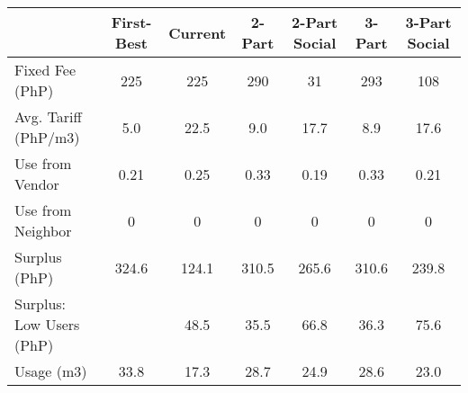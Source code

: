 \begin{tabular}{lcccccc}
  & First-Best & Current & 2-Part  & 2-Part Social  & 3-Part & 3-Part Social \\
\hline
Fixed Fee (PhP) &225&225&290&31&293&108\\
Avg. Tariff (PhP/m3) &5.0&22.5&9.0&17.7&8.9&17.6\\
Use from Vendor &0.21 &0.25 &0.33 &0.19 &0.33 &0.21\\
Use from Neighbor &0 &0 &0 &0 &0 &0 \\
Surplus (PhP) &324.6&124.1&310.5&265.6&310.6&239.8\\
Surplus: Low Users (PhP) &&48.5&35.5&66.8&36.3&75.6\\
Usage (m3) &33.8&17.3&28.7&24.9&28.6&23.0\\
\hline
\end{tabular}
